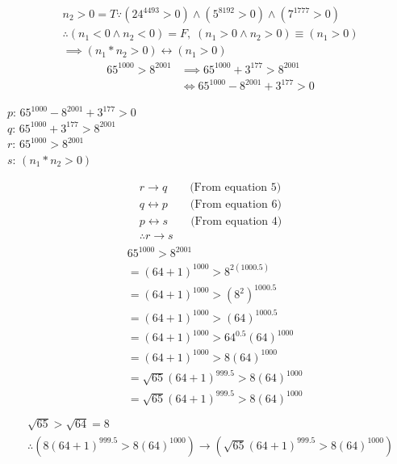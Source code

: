 \documentclass[letterpaper, 12pt]{article}
\newcommand{\then}{\rightarrow}
\begin{document}
\begin{enumerate}
\begin{gather}
    n_2 > 0 = T \because (24^{4493} > 0) \wedge (5^{8192} > 0) \wedge (7^{1777} > 0) \\
    \therefore (n_1 < 0 \wedge n_2 < 0) = F, \; (n_1 > 0 \wedge n_2 > 0) \equiv (n_1 > 0) \\
    \implies (n_1 * n_2 > 0) \leftrightarrow (n_1 > 0)
\end{gather}
\begin{align}
    65^{1000} > 8^{2001} &\implies 65^{1000} + 3^{177} > 8^{2001} \\
    &\iff 65^{1000} - 8^{2001} + 3^{177} > 0
\end{align}
\begin{flushleft}
    $p$: $65^{1000} - 8^{2001} + 3^{177} > 0$ \\
    $q$: $65^{1000} + 3^{177} > 8^{2001}$ \\
    $r$: $65^{1000} > 8^{2001}$ \\
    $s$: $(n_1 * n_2 > 0)$
\end{flushleft}
\begin{gather*}
    r \then q \qquad \text{(From equation 5)} \\
    q \leftrightarrow p \qquad \text{(From equation 6)} \\
    p \leftrightarrow s \qquad \text{(From equation 4)} \\
    \therefore r \then s
\end{gather*}
\begin{align*}
    \begin{split}
        & 65^{1000} > 8^{2001} \\
        &= (64 + 1)^{1000} > 8^{2(1000.5)} \\
        &= (64 + 1)^{1000} > (8^2)^{1000.5} \\
        &= (64 + 1)^{1000} > (64)^{1000.5} \\
        &= (64 + 1)^{1000} > 64^{0.5}(64)^{1000} \\
        &= (64 + 1)^{1000} > 8(64)^{1000} \\
        &= \sqrt{65}(64 + 1)^{999.5} > 8(64)^{1000} \\
        &= \sqrt{65}(64 + 1)^{999.5} > 8(64)^{1000} \\
    \end{split}
\end{align*}
\begin{gather*}
    \sqrt{65} > \sqrt{64} = 8 \\
    \therefore (8(64 + 1)^{999.5} > 8(64)^{1000}) \then (\sqrt{65}(64 + 1)^{999.5} > 8(64)^{1000})
\end{gather*}

\end{enumerate}
\end{document}
